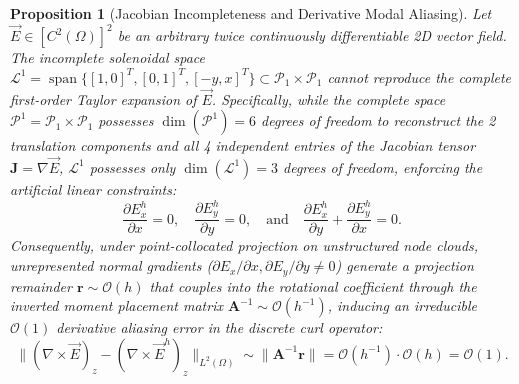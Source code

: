 \documentclass[preprint,12pt]{elsarticle}
\newtheorem{proposition}{Proposition}
\begin{document}
\begin{proposition}[Jacobian Incompleteness and Derivative Modal Aliasing]
Let $\vec{E} \in [C^2(\Omega)]^2$ be an arbitrary twice continuously differentiable 2D vector field. The incomplete solenoidal space $\mathcal{L}^1 = \operatorname{span}\{[1, 0]^T, [0, 1]^T, [-y, x]^T\} \subset \mathcal{P}_1 \times \mathcal{P}_1$ cannot reproduce the complete first-order Taylor expansion of $\vec{E}$. Specifically, while the complete space $\mathcal{P}^1 = \mathcal{P}_1 \times \mathcal{P}_1$ possesses $\dim(\mathcal{P}^1) = 6$ degrees of freedom to reconstruct the 2 translation components and all 4 independent entries of the Jacobian tensor $\mathbf{J} = \nabla\vec{E}$, $\mathcal{L}^1$ possesses only $\dim(\mathcal{L}^1) = 3$ degrees of freedom, enforcing the artificial linear constraints:
\begin{equation}
\frac{\partial E_x^h}{\partial x} = 0, \quad \frac{\partial E_y^h}{\partial y} = 0, \quad \text{and} \quad \frac{\partial E_x^h}{\partial y} + \frac{\partial E_y^h}{\partial x} = 0.
\label{eq:L1_derivative_constraints}
\end{equation}
Consequently, under point-collocated projection on unstructured node clouds, unrepresented normal gradients ($\partial E_x/\partial x, \partial E_y/\partial y \neq 0$) generate a projection remainder $\mathbf{r} \sim \mathcal{O}(h)$ that couples into the rotational coefficient through the inverted moment placement matrix $\mathbf{A}^{-1} \sim \mathcal{O}(h^{-1})$, inducing an irreducible $\mathcal{O}(1)$ derivative aliasing error in the discrete curl operator:
\begin{equation}
\|(\nabla \times \vec{E})_z - (\nabla \times \vec{E}^h)_z\|_{L^2(\Omega)} \sim \|\mathbf{A}^{-1} \mathbf{r}\| = \mathcal{O}(h^{-1}) \cdot \mathcal{O}(h) = \mathcal{O}(1).
\label{eq:aliasing_order_proof}
\end{equation}
\end{proposition}
\end{document}
